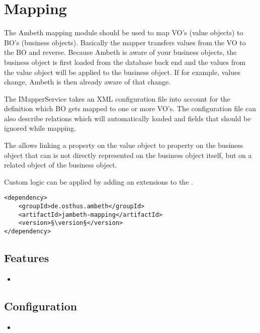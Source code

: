 \section{Mapping}
\label{module:Mapping}
\ClearAPI
\TODO The Ambeth mapping module should be used to map VO's (value objects) to BO's (business objects). Basically the mapper transfers values from the VO to the BO and reverse. Because Ambeth is aware of your business objects, the business object is first loaded from the database back end and the values from the value object will be applied to the business object. If for example, values change, Ambeth is then already aware of that change. 

The IMapperService takes an XML configuration file into account for the definition which BO gets mapped to one or more VO's. The configuration file can also describe relations which will automatically loaded and fields that should be ignored while mapping.

The  allows linking a property on the value object to property on the business object that can is not directly represented on the business object itself, but on a related object of the business object. 

Custom logic can be applied by adding an extensions to the .


\begin{lstlisting}[style=POM,caption={Maven modules to use \emph{Ambeth Mapping}}]
<dependency>
	<groupId>de.osthus.ambeth</groupId>
	<artifactId>jambeth-mapping</artifactId>
	<version>§\version§</version>
</dependency>
\end{lstlisting}
\subsection{Features}
\begin{itemize}
	\item \TODO
\end{itemize}

\subsection{Configuration}
\begin{itemize}
	\item {}
\end{itemize}
